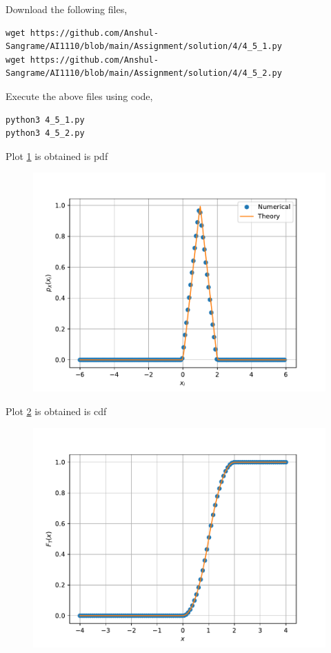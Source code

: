 \documentclass[journal,12pt,twocolumn]{IEEEtran}
\renewcommand\thesection{\arabic{section}}
\begin{document}
\begin{enumerate}[label=\thesection.\arabic*
,ref=\thesection.\theenumi]
\solution

Download the following files,
\begin{lstlisting}
wget https://github.com/Anshul-Sangrame/AI1110/blob/main/Assignment/solution/4/4_5_1.py
wget https://github.com/Anshul-Sangrame/AI1110/blob/main/Assignment/solution/4/4_5_2.py
\end{lstlisting}
Execute the above files using code,
\begin{lstlisting}
python3 4_5_1.py
python3 4_5_2.py
\end{lstlisting}
Plot \ref{fig:4.5.1} is obtained is pdf
\begin{figure}[!ht]
    \centering
    \includegraphics[width=\columnwidth]{../figs/tri_pdf.pdf}
    \caption{}
    \label{fig:4.5.1}
\end{figure}
Plot \ref{fig:4.5.2} is obtained is cdf
\begin{figure}[!ht]
    \centering
    \includegraphics[width=\columnwidth]{../figs/tri_cdf.pdf}
    \caption{}
    \label{fig:4.5.2}
\end{figure}
\end{enumerate}
%
%
\end{document}
